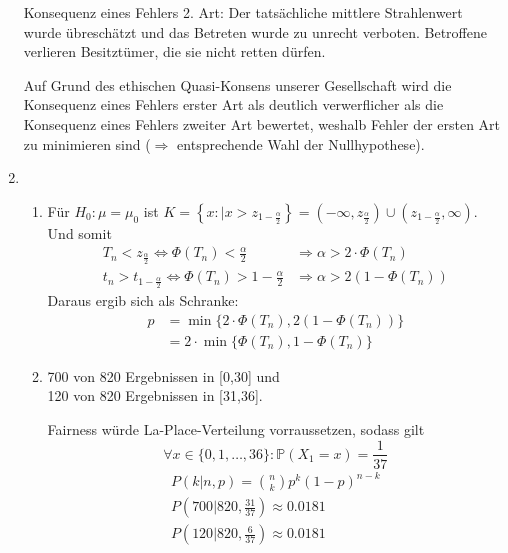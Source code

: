 \documentclass[a4paper]{scrartcl}
\def \blattnr {9}
\begin{document}
\begin{enumerate}[label=\bfseries \blattnr.\arabic*]
      Konsequenz eines Fehlers 2. Art: Der tatsächliche mittlere Strahlenwert wurde übreschätzt und das Betreten wurde zu unrecht 
      verboten. Betroffene verlieren Besitztümer, die sie nicht retten dürfen. 
      
      Auf Grund des ethischen Quasi-Konsens unserer Gesellschaft wird die Konsequenz eines Fehlers erster Art als deutlich verwerflicher 
      als die Konsequenz eines Fehlers zweiter Art bewertet, weshalb Fehler der ersten Art zu minimieren sind ($\Rightarrow$ entsprechende 
      Wahl der Nullhypothese).
    
    \item 
      \begin{enumerate}
       \item Für $H_0: \mu = \mu_0$ ist 
       $K = \left\{x:|x>z_{1-\frac\alpha 2} \right\} = \left(-\infty, z_{\frac\alpha 2}\right) \cup \left(z_{1-\frac\alpha 2}, \infty \right)$. Und somit
	\begin{equation*}
	  \begin{split}
	    T_n<z_{\frac\alpha 2} \Leftrightarrow \Phi(T_n)<\frac\alpha 2 &\Rightarrow \alpha > 2\cdot \Phi(T_n) \\
	    t_n>t_{1-\frac\alpha 2} \Leftrightarrow \Phi(T_n) > 1-\frac\alpha 2 &\Rightarrow \alpha > 2(1-\Phi(T_n))
	  \end{split}
	\end{equation*}
      Daraus ergib sich als Schranke: 
      \begin{equation*}
	  \begin{split}
	    p 
	    &= \min\{2\cdot \Phi(T_n), 2(1-\Phi(T_n))\}  \\
	    &= 2 \cdot \min\{\Phi(T_n), 1-\Phi(T_n)\}
	  \end{split}
	\end{equation*}
       
       \item 
        700 von 820 Ergebnissen in [0,30] und \\
	120 von 820 Ergebnissen in [31,36].
	
	Fairness würde La-Place-Verteilung vorraussetzen, sodass gilt \\
	$$\forall x \in \{0,1,\ldots,36\}: \mathbb{P}(X_1 = x) = \frac1{37}$$
	\begin{equation*}
	  \begin{split}
	    P(k|n,p) = \binom{n}{k} p^ k(1-p)^{n-k} \\
	    P\left(700|820,\frac{31}{37}\right) \approx 0.0181 \\ 
	    P\left(120|820,\frac{6}{37}\right) \approx 0.0181
	  \end{split}
	\end{equation*}
	

\end{enumerate}
\end{enumerate}
\end{document}
